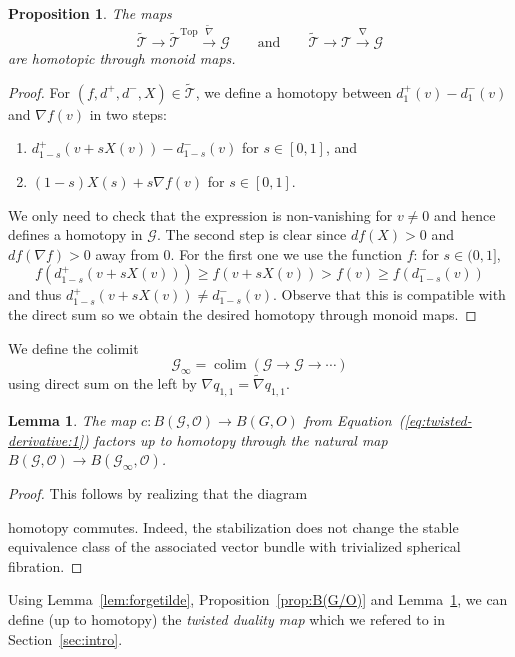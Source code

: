\documentclass[reqno]{amsart}
\theoremstyle{theorem}
\newtheorem{lemma}[corollary]{Lemma}
\newtheorem{proposition}[corollary]{Proposition}
\theoremstyle{remark}
\theoremstyle{definition}
\DeclareMathOperator*{\colim}{colim}
\newcommand{\tnabla}{\widetilde{\nabla}}
\newcommand{\T}{\mathcal{T}}
\newcommand{\TT}{\widetilde{\mathcal{T}}}
\newcommand{\GG}{\mathcal{G}}
\newcommand{\OO}{\mathcal{O}}
\newcommand{\TOP}{\mathrm{Top}}
\begin{document}
\begin{proposition}\label{prop:derivativesagree}
The maps $$\TT \to \TT^\TOP \xrightarrow{\tnabla}  \GG \qquad \text{and} \qquad \TT\to\T\xrightarrow{\nabla} \GG$$  are homotopic through monoid maps.
\end{proposition}
\begin{proof}
For $(f,d^+,d^-,X) \in \TT$, we define a homotopy between $d_1^+(v)-d_1^-(v)$ and $\nabla f(v)$
in two steps:
\begin{enumerate}
\item $d_{1-s}^+(v+sX(v))-d_{1-s}^-(v)$ for  $s\in[0,1]$, and
\item $(1-s)X(s)+s\nabla f(v)$ for $s\in [0,1]$.
\end{enumerate}
We only need to check that the expression is non-vanishing for $v\neq 0$ and hence defines a homotopy in $\GG$.
The second step is clear since $df(X)>0$ and $df(\nabla f)>0$ away from $0$. For the first one we use the function $f$: for $s\in(0,1]$, 
\[f(d_{1-s}^+(v+sX(v)))\geq f(v+sX(v))>f(v)\geq f(d_{1-s}^-(v))\]
and thus $d_{1-s}^+(v+sX(v))\neq d_{1-s}^-(v)$.
Observe that this is compatible with the direct sum so we obtain the desired homotopy through monoid maps.
\end{proof}


We define the colimit
$$\GG_\infty = \colim \left( \GG \to \GG \to \cdots \right) $$
using direct sum on the left by $\nabla q_{1,1}=\tnabla q_{1,1}$.
\begin{lemma}\label{lem:colimG/O}
  The map $c: B(\GG,\OO) \to B(G,O)$ from Equation~(\ref{eq:twisted-derivative:1}) factors up to homotopy through the natural map $B(\GG,\OO) \to B(\GG_\infty,\OO)$. 
\end{lemma}


\begin{proof}
  This follows by realizing that the diagram
  \begin{center}
  \end{center}
  homotopy commutes. Indeed, the stabilization does not change the stable equivalence class of the associated vector bundle with trivialized spherical fibration. 
\end{proof}


Using Lemma~\ref{lem:forgetilde}, Proposition~\ref{prop:B(G/O)} and Lemma~\ref{lem:colimG/O}, we can define
(up to homotopy) the \emph{twisted duality map} which we refered to in Section~\ref{sec:intro}.
\end{document}
